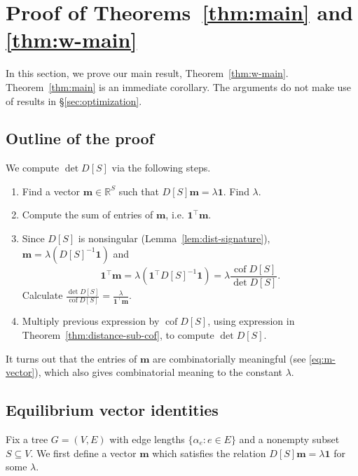 \documentclass[12pt]{amsart}
\theoremstyle{definition}
\newcommand{\RR}{\mathbb{R}}
\newcommand{\bone}{\mathbf{1}}
\newcommand{\boldm}{\mathbf{m}}
\newcommand{\tr}{\intercal}
\DeclareMathOperator{\cof}{cof}
\begin{document}
\section{Proof of Theorems~\ref{thm:main} and \ref{thm:w-main}}
\label{sec:distance_proofs}

In this section, we prove our main result, Theorem~\ref{thm:w-main}.
Theorem~\ref{thm:main} is an immediate corollary.
The arguments do not make use of results in \S\ref{sec:optimization}.

\subsection{Outline of the proof}

We compute $\det D[S]$ via the following steps.

\begin{enumerate}[label=(\Roman*)]
\item
Find a vector $\boldm \in \RR^S$ such that $D[S]\boldm = \lambda \bone$.
Find $\lambda$.

\item 
Compute the sum of entries of $\boldm$, i.e. $\bone^\tr \boldm$.

\item 
Since $D[S]$ is nonsingular (Lemma~\ref{lem:dist-signature}), $\boldm = \lambda (D[S]^{-1} \bone)$ and
\[
	\bone^\tr \boldm = \lambda (\bone^\tr D[S]^{-1} \bone) = \lambda \frac{\cof D[S]}{\det D[S]}.
\]
Calculate $\displaystyle \frac{\det D[S]}{\cof D[S]} = \frac{\lambda}{\bone^\tr \boldm}$.


\item
Multiply previous expression by $\cof D[S]$, using expression in Theorem~\ref{thm:distance-sub-cof}, to compute $\det D[S]$.
\end{enumerate}


It turns out that the entries of $\boldm$ are combinatorially meaningful (see \eqref{eq:m-vector}),
which also gives combinatorial meaning to
the constant $\lambda$.

\subsection{Equilibrium vector identities}

Fix a tree $G = (V,E)$ with edge lengths $\{\alpha_e \colon e \in E\}$ and a nonempty subset $S \subseteq V$.
We first define a vector $\boldm$ which satisfies the relation $D[S] \boldm = \lambda \bone$ for some $\lambda$.
\end{document}

